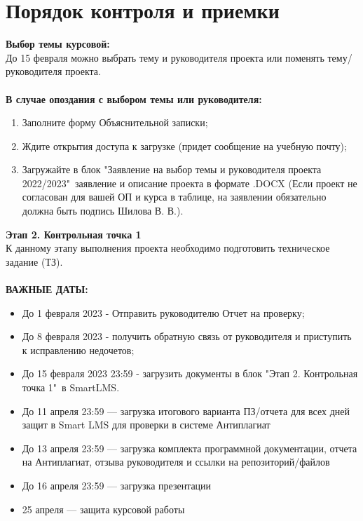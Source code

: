 \documentclass[draft]{article}
\begin{document}
\section {Порядок контроля и приемки}
\textbf{Выбор темы курсовой:}\\
До 15 февраля можно выбрать тему и руководителя проекта или поменять тему/руководителя проекта.\\
~\\
\textbf{В случае опоздания с выбором темы или руководителя:}
\begin{enumerate}
\item Заполните форму Объяснительной записки;
\item Ждите открытия доступа к загрузке (придет сообщение на учебную почту);
\item Загружайте в блок "{}Заявление на выбор темы и руководителя проекта 2022/2023"{}\ заявление и описание проекта в формате .DOCX (Если проект не согласован для вашей ОП и курса в таблице, на заявлении обязательно должна быть подпись Шилова В. В.).
\end{enumerate}
\textbf{Этап 2. Контрольная точка 1}\\
К данному этапу выполнения проекта необходимо подготовить техническое задание (ТЗ).\\
~\\
\textbf{ВАЖНЫЕ ДАТЫ:}
\begin{itemize}
\item До 1 февраля 2023 - Отправить руководителю Отчет на проверку;
\item До 8 февраля 2023 - получить обратную связь от руководителя и приступить к исправлению недочетов;
\item До 15 февраля 2023 23:59 - загрузить документы в блок "{}Этап 2. Контрольная точка 1"{}\ в SmartLMS.
\item До 11 апреля 23:59 — загрузка итогового варианта ПЗ/отчета для всех дней защит в Smart LMS для проверки в системе Антиплагиат
\item До 13 апреля 23:59 — загрузка комплекта программной документации, отчета на Антиплагиат, отзыва руководителя и ссылки на репозиторий/файлов
\item До 16 апреля 23:59 — загрузка презентации
\item 25 апреля — защита курсовой работы
\end{itemize}
\newpage
{}
\end{document}
